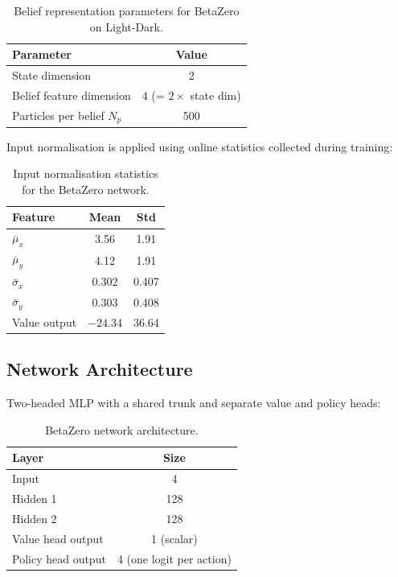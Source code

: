 \documentclass[acmlarge, manuscript, screen, review, natbib=false, oneside]{acmart}
\begin{document}
\begin{table}[ht]
    \centering
    \small
    \setlength{\tabcolsep}{4pt}
    \begin{tabular}{|l|c|}
        \hline
        \textbf{Parameter} & \textbf{Value} \\
        \hline
        State dimension & 2 \\
        \hline
        Belief feature dimension & 4 (= $2 \times$ state dim) \\
        \hline
        Particles per belief $N_p$ & 500 \\
        \hline
    \end{tabular}
    \caption{Belief representation parameters for BetaZero on Light-Dark.}
    \label{tab:bz_belief}
\end{table}

Input normalisation is applied using online statistics collected during training:

\begin{table}[ht]
    \centering
    \small
    \setlength{\tabcolsep}{4pt}
    \begin{tabular}{|l|c|c|}
        \hline
        \textbf{Feature} & \textbf{Mean} & \textbf{Std} \\
        \hline
        $\bar{\mu}_x$ & 3.56 & 1.91 \\
        \hline
        $\bar{\mu}_y$ & 4.12 & 1.91 \\
        \hline
        $\bar{\sigma}_x$ & 0.302 & 0.407 \\
        \hline
        $\bar{\sigma}_y$ & 0.303 & 0.408 \\
        \hline
        Value output & $-24.34$ & 36.64 \\
        \hline
    \end{tabular}
    \caption{Input normalisation statistics for the BetaZero network.}
    \label{tab:bz_normalization}
\end{table}

\subsection{Network Architecture}

Two-headed MLP with a shared trunk and separate value and policy heads:

\begin{table}[ht]
    \centering
    \small
    \setlength{\tabcolsep}{4pt}
    \begin{tabular}{|l|c|}
        \hline
        \textbf{Layer} & \textbf{Size} \\
        \hline
        Input & 4 \\
        \hline
        Hidden 1 & 128 \\
        \hline
        Hidden 2 & 128 \\
        \hline
        Value head output & 1 (scalar) \\
        \hline
        Policy head output & 4 (one logit per action) \\
        \hline
    \end{tabular}
    \caption{BetaZero network architecture.}
    \label{tab:bz_network}
\end{table}
\end{document}
